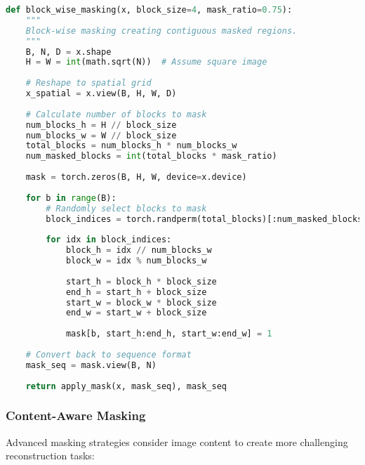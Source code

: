 \begin{lstlisting}[language=Python, caption=Block-wise masking for structured visual learning]
def block_wise_masking(x, block_size=4, mask_ratio=0.75):
    """
    Block-wise masking creating contiguous masked regions.
    """
    B, N, D = x.shape
    H = W = int(math.sqrt(N))  # Assume square image
    
    # Reshape to spatial grid
    x_spatial = x.view(B, H, W, D)
    
    # Calculate number of blocks to mask
    num_blocks_h = H // block_size
    num_blocks_w = W // block_size
    total_blocks = num_blocks_h * num_blocks_w
    num_masked_blocks = int(total_blocks * mask_ratio)
    
    mask = torch.zeros(B, H, W, device=x.device)
    
    for b in range(B):
        # Randomly select blocks to mask
        block_indices = torch.randperm(total_blocks)[:num_masked_blocks]
        
        for idx in block_indices:
            block_h = idx // num_blocks_w
            block_w = idx % num_blocks_w
            
            start_h = block_h * block_size
            end_h = start_h + block_size
            start_w = block_w * block_size
            end_w = start_w + block_size
            
            mask[b, start_h:end_h, start_w:end_w] = 1
    
    # Convert back to sequence format
    mask_seq = mask.view(B, N)
    
    return apply_mask(x, mask_seq), mask_seq
\end{lstlisting}

\subsubsection{Content-Aware Masking}

Advanced masking strategies consider image content to create more challenging reconstruction tasks:


